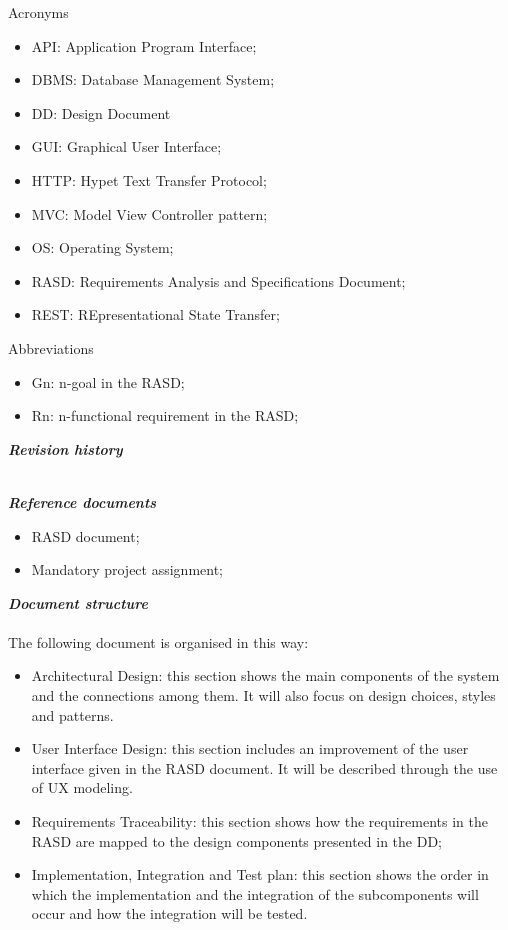 \begin{legal}
\begin{legal}
				\item Acronyms
				\begin{itemize}
					\item API: Application Program Interface;
					\item DBMS: Database Management System;
					\item DD: Design Document
					\item GUI: Graphical User Interface;
					\item HTTP: Hypet Text Transfer Protocol;
					\item MVC: Model View Controller pattern;
					\item OS: Operating System;
					\item RASD: Requirements Analysis and Specifications Document;
					\item REST: REpresentational State Transfer;
				\end{itemize}
				\item Abbreviations\\
				\begin{itemize}
					\item Gn: n-goal in the RASD;
					\item Rn: n-functional requirement in the RASD;
				\end{itemize}
			\end{legal}
		\item \textit{\textbf{Revision history}}\\\\
		\item \textit{\textbf{Reference documents}}\\
			\begin{itemize}
				\item RASD document;
				\item Mandatory project assignment;
			\end{itemize}
		\item \textit{\textbf{Document structure}}\\\\
		The following document is organised in this way:
		\begin{itemize}
				\item Architectural Design: this section shows the main components of the system and the connections among them. It will also focus on design choices, styles and patterns.
				\item User Interface Design: this section includes an improvement of the user interface given in the RASD document. It will be described through the use of UX modeling.
				\item Requirements Traceability: this section shows how the requirements in the RASD are mapped to the design components presented in the DD;
				\item Implementation, Integration and Test plan: this section shows the order in which the implementation and the integration of the subcomponents will occur and how the integration will be tested.
			\end{itemize}
  	\end{legal}

